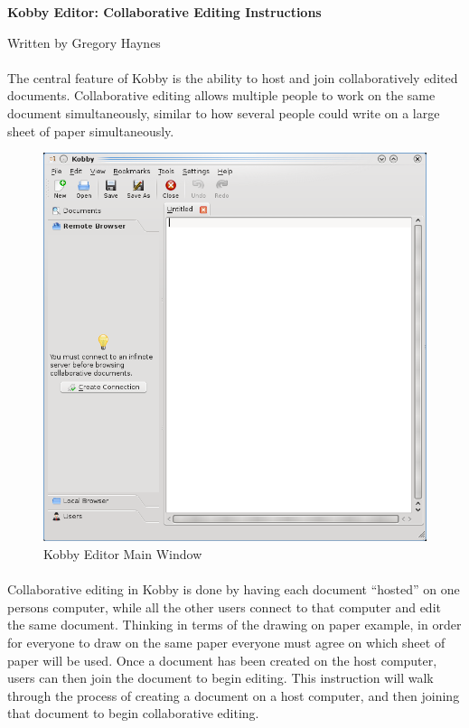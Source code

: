 \documentclass[11pt]{article}
\begin{document}
\centerline {\Large \bf Kobby Editor: Collaborative Editing Instructions}
\centerline {Written by Gregory Haynes}

\paragraph{}The central feature of Kobby is the ability to host and join collaboratively edited documents.  Collaborative editing allows multiple people to work on the same document simultaneously, similar to how several people could write on a large sheet of paper simultaneously.

\begin{figure}[tbh]
\begin{center}
\includegraphics[width=.7\textwidth]{kobbymain.png}
\end{center}
\caption{Kobby Editor Main Window}
\end{figure}

\paragraph{}Collaborative editing in Kobby is done by having each document ``hosted'' on one persons computer, while all the other users connect to that computer and edit the same document.  Thinking in terms of the drawing on paper example, in order for everyone to draw on the same paper everyone must agree on which sheet of paper will be used.  Once a document has been created on the host computer, users can then join the document to begin editing.  This instruction will walk through the process of creating a document on a host computer, and then joining that document to begin collaborative editing.
\end{document}
